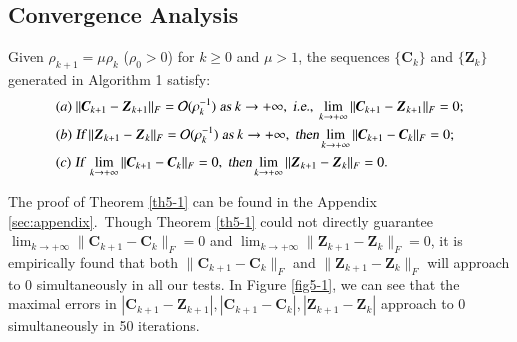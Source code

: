 \subsection{Convergence Analysis}


\begin{theorem}
\label{th5-1}
Given $\rho_{k+1}=\mu\rho_{k}$ ($\rho_{0}>0$) for $k\ge0$ and $\mu>1$, the sequences $\{\bm{C}_{k}\}$ and $\{\bm{Z}_{k}\}$ generated in Algorithm 1 satisfy:
\begin{align}
&
(a)\ 
\|\bm{C}_{k+1}-\bm{Z}_{k+1}\|_{F}=\mathcal{O}(\rho_{k}^{-1})
\ 
\textsl{as}\ k \to +\infty
,\ 
\textsl{i.e.},\ 
\lim_{k \to +\infty} \|\bm{C}_{k+1}-\bm{Z}_{k+1}\|_{F}=0;
\\
&
(b)\ 
\textsl{If}\ 
\|\bm{Z}_{k+1}-\bm{Z}_{k}\|_{F}=\mathcal{O}(\rho_{k}^{-1})
\ 
\textsl{as}\ k \to +\infty
,\ 
\textsl{then} 
\lim_{k \to +\infty} \|\bm{C}_{k+1}-\bm{C}_{k}\|_{F}=0;
\\
&
(c)\ 
\textsl{If}\ 
\lim_{k \to +\infty} \|\bm{C}_{k+1}-\bm{C}_{k}\|_{F}=0
,\ 
\textsl{then} 
\lim_{k \to +\infty} \|\bm{Z}_{k+1}-\bm{Z}_{k}\|_{F}=0.
\end{align}
\end{theorem}
The proof of Theorem \ref{th5-1} can be found in the Appendix \ref{sec:appendix}.\ Though Theorem \ref{th5-1} could not directly guarantee $\lim_{k \to +\infty}\|\bm{C}_{k+1}-\bm{C}_{k}\|_{F}=0$ and $\lim_{k \to +\infty}\|\bm{Z}_{k+1}-\bm{Z}_{k}\|_{F}=0$, it is empirically found that both $\|\bm{C}_{k+1}-\bm{C}_{k}\|_{F}$ and $\|\bm{Z}_{k+1}-\bm{Z}_{k}\|_{F}$ will approach to $0$ simultaneously in all our tests. In Figure \ref{fig5-1}, we can see that the maximal errors in $|\bm{C}_{k+1}-\bm{Z}_{k+1}|,|\bm{C}_{k+1}-\bm{C}_{k}|,|\bm{Z}_{k+1}-\bm{Z}_{k}|$ approach to $0$ simultaneously in 50 iterations.


